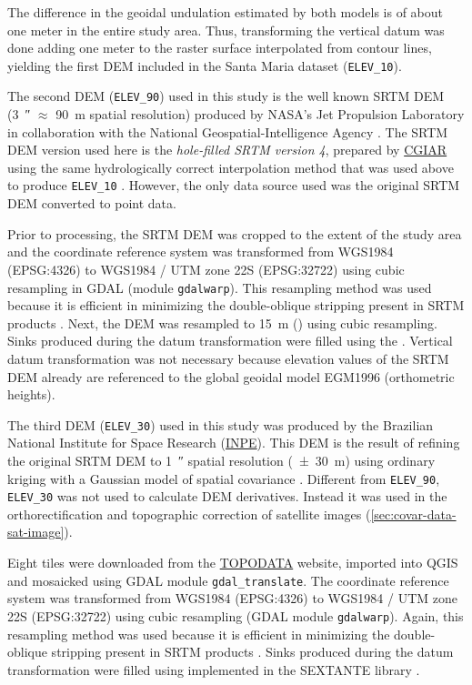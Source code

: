 The difference in the geoidal undulation estimated by both models is of about one meter in the 
entire study area. Thus, transforming the vertical datum was done adding one meter to the raster 
surface interpolated from contour lines, yielding the first DEM included in the Santa Maria dataset
(\texttt{ELEV\_10}).

The second DEM (\texttt{ELEV\_90}) used in this study is the well known SRTM DEM 
(\SI{3}{\arcsecond} $\approx$ \SI{90}{\metre} spatial resolution) produced by NASA’s Jet 
Propulsion Laboratory in collaboration with the National Geospatial-Intelligence Agency 
\cite{RodriguezEtAl2006}. The SRTM DEM version used here is the \emph{hole-filled SRTM version 
\num{4}}, prepared by \href{http://www.cgiar.org/}{CGIAR} using the same hydrologically correct 
interpolation method that was used above to produce \texttt{ELEV\_10} \cite{ReuterEtAl2007, 
JarvisEtAl2008}. However, the only data source used was the original SRTM DEM converted to point 
data.

Prior to processing, the SRTM DEM was cropped to the extent of the study area and the coordinate 
reference system was transformed from WGS1984 (EPSG:4326) to WGS1984 / UTM zone 22S (EPSG:32722) 
using cubic resampling in GDAL (module \texttt{gdalwarp}). This resampling method was used because 
it is efficient in minimizing the double-oblique stripping present in SRTM products 
\cite{Samuel-RosaEtAl2013c}. Next, the DEM was resampled to \SI{15}{\metre} 
() using cubic resampling. Sinks produced during the datum transformation 
were filled using the . Vertical datum transformation was not necessary because 
elevation values of the SRTM DEM already are referenced to the global geoidal model EGM1996 
(orthometric heights).

The third DEM (\texttt{ELEV\_30}) used in this study was produced by the Brazilian National 
Institute for Space Research (\href{http://www.inpe.br/}{INPE}). This DEM is the result of refining 
the original SRTM DEM to \SI{1}{\arcsecond} spatial resolution (\SI{\pm30}{\metre}) using ordinary 
kriging with a Gaussian model of spatial covariance \cite{ValerianoEtAl2012}. Different from 
\texttt{ELEV\_90}, \texttt{ELEV\_30} was not used to calculate DEM derivatives. Instead it was used 
in the orthorectification and topographic correction of satellite images (\autoref{sec:covar-data-sat-image}).

Eight tiles were downloaded from the \href{http://www.dsr.inpe.br/topodata/}{TOPODATA} website, 
imported into QGIS and mosaicked using GDAL module \texttt{gdal\_translate}. The coordinate 
reference system was transformed from WGS1984 (EPSG:4326) to WGS1984 / UTM zone 22S (EPSG:32722) 
using cubic resampling (GDAL module \texttt{gdalwarp}). Again, this resampling method was used 
because it is efficient in minimizing the double-oblique stripping present in SRTM products 
\cite{Samuel-RosaEtAl2013c}. Sinks produced during the datum transformation were filled using 
 implemented in the SEXTANTE library \cite{SEXTANTE2012}.

